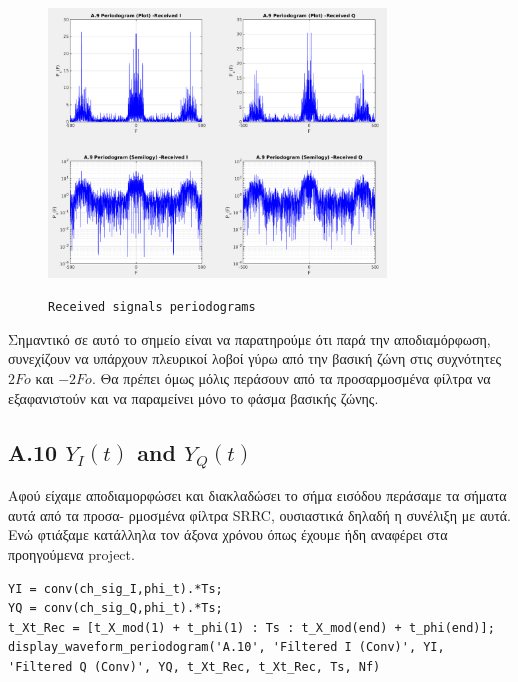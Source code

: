 \documentclass[11pt]{article}
\begin{document}
    \begin{figure}[H]
        \centering
        \includegraphics[scale=0.5, width=0.8\textwidth]{img/A9_rec_period.png} \\
        \caption{\texttt{Received signals periodograms}}
    \end{figure}
    
    \newpage \par \noindent
    Σημαντικό σε αυτό το σημείο είναι να παρατηρούμε ότι παρά την αποδιαμόρφωση, συνεχίζουν να υπάρχουν πλευρικοί λοβοί γύρω από την βασική ζώνη στις συχνότητες $2Fo$ και $-2Fo$.
    Θα πρέπει όμως μόλις περάσουν από τα προσαρμοσμένα φίλτρα να εξαφανιστούν και να παραμείνει μόνο το φάσμα βασικής ζώνης.
    
    \subsection*{A.10 $Y_I(t)$ and $Y_Q(t)$}
    Αφού είχαμε αποδιαμορφώσει και διακλαδώσει το σήμα εισόδου περάσαμε τα σήματα αυτά από τα προσα- ρμοσμένα φίλτρα SRRC, ουσιαστικά δηλαδή η συνέλιξη με αυτά.
    Ενώ φτιάξαμε κατάλληλα τον άξονα χρόνου όπως έχουμε ήδη αναφέρει στα προηγούμενα project.
    
    \begin{lstlisting}[caption = {A.10 \texttt{Calculate $Y_I(t)$ and $Y_Q(t)$}}]
% A.10
YI = conv(ch_sig_I,phi_t).*Ts;
YQ = conv(ch_sig_Q,phi_t).*Ts;
t_Xt_Rec = [t_X_mod(1) + t_phi(1) : Ts : t_X_mod(end) + t_phi(end)];
display_waveform_periodogram('A.10', 'Filtered I (Conv)', YI, 'Filtered Q (Conv)', YQ, t_Xt_Rec, t_Xt_Rec, Ts, Nf)
    \end{lstlisting}
    
\end{document}
